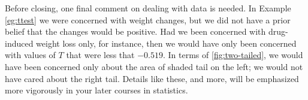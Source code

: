 \documentclass[../book.tex]{subfiles}
\begin{document}
Before closing, one final comment on dealing with data is needed. In Example \ref{eg:ttest} we were concerned with weight changes, but we did not have a prior belief that the changes would be positive. Had we been concerned with drug-induced weight loss only, for instance, then we would have only been concerned with values of \(T\) that were less that \(-0.519\). In terms of \cref{fig:two-tailed}, we would have been concerned only about the area of shaded tail on the left; we would not have cared about the right tail. Details like these, and more, will be emphasized more vigorously in your later courses in statistics.
\end{document}
